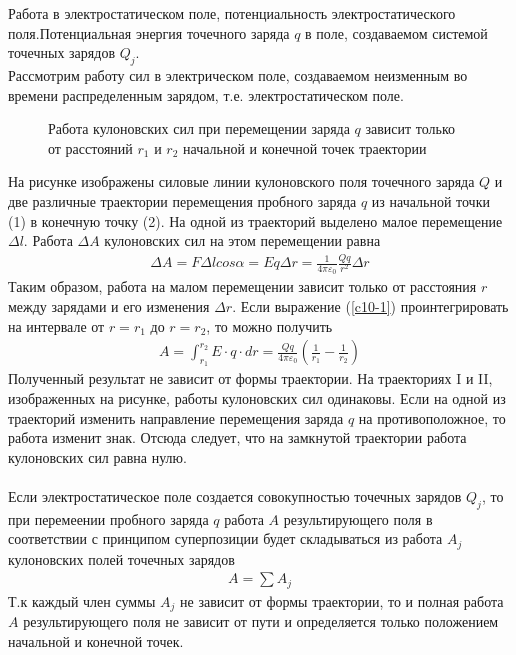 \documentclass[__main__.tex]{subfiles}
\begin{document}
	
	 Работа в электростатическом поле, потенциальность электростатического поля.Потенциальная энергия точечного заряда $q$ в поле, создаваемом системой точечных зарядов $Q_j$.\\ 
	
	Рассмотрим работу сил в электрическом поле, создаваемом неизменным во времени распределенным зарядом, т.е. электростатическом поле.
	\begin{figure}[h]
		\label{c101}
		\center{\texttt{[image: c-10-1]}}
		\caption{Работа кулоновских сил при перемещении заряда $q$ зависит только от расстояний $r_1$ и $r_2$ начальной и конечной точек траектории}
	\end{figure}

	На рисунке изображены силовые линии кулоновского поля точечного заряда $Q$ и две различные траектории перемещения пробного заряда $q$ из начальной точки (1) в конечную точку (2). На одной из траекторий выделено малое перемещение $\Delta l$. Работа $\Delta A$ кулоновских сил на этом перемещении равна
	\begin{gather}
		\label{c10-1}
		\Delta A = F\Delta l cos\alpha = Eq\Delta r = \frac{1}{4\pi\varepsilon_0}\frac{Qq}{r^2}\Delta r
	\end{gather} 
	Таким образом, работа на малом перемещении зависит только от расстояния $r$ между зарядами и его изменения $\Delta r$. Если выражение (\ref{c10-1}) проинтегрировать на интервале от $r=r_1$ до $r=r_2$, то можно получить 
	\begin{gather*}
		A = \int_{r_1}^{r_2}E\cdot q\cdot dr = \frac{Qq}{4\pi\varepsilon_0}\left(\frac{1}{r_1}-\frac{1}{r_2}\right) 
	\end{gather*} 	
	Полученный результат не зависит от формы траектории. На траекториях I и II, изображенных на рисунке, работы кулоновских сил одинаковы. Если на одной из траекторий изменить направление перемещения заряда $q$ на противоположное, то работа изменит знак. Отсюда следует, что на замкнутой траектории работа кулоновских сил равна нулю.\\\\
	Если электростатическое поле создается совокупностью точечных зарядов $Q_j$, то при перемеении пробного заряда $q$ работа $A$ результирующего поля в соответствии с принципом суперпозиции будет складываться из работа $A_j$  кулоновских полей точечных зарядов
	\begin{gather*}
		A = \sum A_j
	\end{gather*} 
	Т.к каждый член суммы $A_j$ не зависит от формы траектории, то и полная работа $A$ результирующего поля не зависит от пути и определяется только положением начальной и конечной точек.
\end{document}
